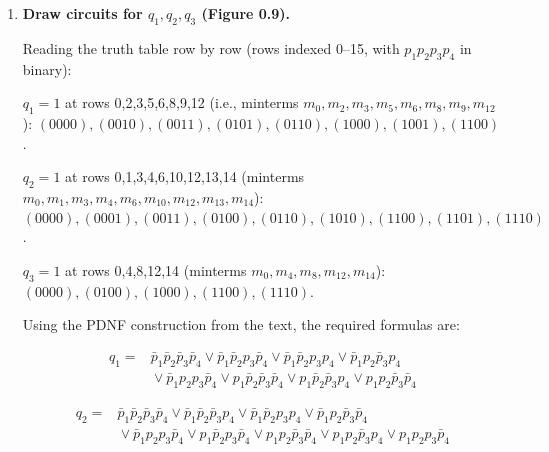 \documentclass[11pt,openany]{book}
\begin{document}
\begin{enumerate}[{0.}1. ]
\begin{center}
\end{center}

\item \textbf{Draw circuits for $q_1, q_2, q_3$ (Figure 0.9).}

Reading the truth table row by row (rows indexed 0--15, with $p_1p_2p_3p_4$ in binary):

\textit{$q_1 = 1$} at rows 0,2,3,5,6,8,9,12 (i.e., minterms $m_0,m_2,m_3,m_5,m_6,m_8,m_9,m_{12}$):
$(0000),(0010),(0011),(0101),(0110),(1000),(1001),(1100)$.

\textit{$q_2 = 1$} at rows 0,1,3,4,6,10,12,13,14 (minterms $m_0,m_1,m_3,m_4,m_6,m_{10},m_{12},m_{13},m_{14}$):
$(0000),(0001),(0011),(0100),(0110),(1010),(1100),(1101),(1110)$.

\textit{$q_3 = 1$} at rows 0,4,8,12,14 (minterms $m_0,m_4,m_8,m_{12},m_{14}$):
$(0000),(0100),(1000),(1100),(1110)$.

Using the PDNF construction from the text, the required formulas are:

\[
\begin{aligned}
q_1 ={}&
\bar p_1\bar p_2\bar p_3\bar p_4
\vee \bar p_1\bar p_2 p_3\bar p_4
\vee \bar p_1\bar p_2 p_3 p_4
\vee \bar p_1 p_2\bar p_3 p_4\\
&{}\vee \bar p_1 p_2 p_3\bar p_4
\vee p_1\bar p_2\bar p_3\bar p_4
\vee p_1\bar p_2\bar p_3 p_4
\vee p_1 p_2\bar p_3\bar p_4
\end{aligned}
\]

\[
\begin{aligned}
q_2 ={}&
\bar p_1\bar p_2\bar p_3\bar p_4
\vee \bar p_1\bar p_2\bar p_3 p_4
\vee \bar p_1\bar p_2 p_3 p_4
\vee \bar p_1 p_2\bar p_3\bar p_4\\
&{}\vee \bar p_1 p_2 p_3\bar p_4
\vee p_1\bar p_2 p_3\bar p_4
\vee p_1 p_2\bar p_3\bar p_4
\vee p_1 p_2\bar p_3 p_4
\vee p_1 p_2 p_3\bar p_4
\end{aligned}
\]


\end{enumerate}
\end{document}
